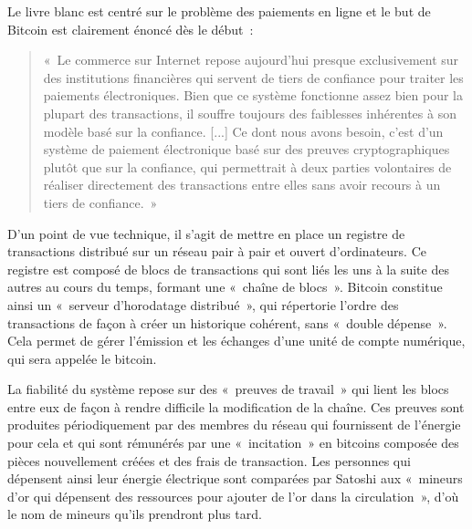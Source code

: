 Le livre blanc est centré sur le problème des paiements en ligne et le but de Bitcoin est clairement énoncé dès le début~:

\begin{quote}
«~Le commerce sur Internet repose aujourd'hui presque exclusivement sur des institutions financières qui servent de tiers de confiance pour traiter les paiements électroniques. Bien que ce système fonctionne assez bien pour la plupart des transactions, il souffre toujours des faiblesses inhérentes à son modèle basé sur la confiance. [...] Ce dont nous avons besoin, c'est d'un système de paiement électronique basé sur des preuves cryptographiques plutôt que sur la confiance, qui permettrait à deux parties volontaires de réaliser directement des transactions entre elles sans avoir recours à un tiers de confiance.~»
\end{quote}


D'un point de vue technique, il s'agit de mettre en place un registre de transactions distribué sur un réseau pair à pair et ouvert d'ordinateurs. Ce registre est composé de blocs de transactions qui sont liés les uns à la suite des autres au cours du temps, formant une «~chaîne de blocs~». Bitcoin constitue ainsi un «~serveur d'horodatage distribué~», qui répertorie l'ordre des transactions de façon à créer un historique cohérent, sans «~double dépense~». Cela permet de gérer l'émission et les échanges d'une unité de compte numérique, qui sera appelée le bitcoin.

La fiabilité du système repose sur des «~preuves de travail~» qui lient les blocs entre eux de façon à rendre difficile la modification de la chaîne. Ces preuves sont produites périodiquement par des membres du réseau qui fournissent de l'énergie pour cela et qui sont rémunérés par une «~incitation~» en bitcoins composée des pièces nouvellement créées et des frais de transaction. Les personnes qui dépensent ainsi leur énergie électrique sont comparées par Satoshi aux «~mineurs d'or qui dépensent des ressources pour ajouter de l'or dans la circulation~», d'où le nom de mineurs qu'ils prendront plus tard.

